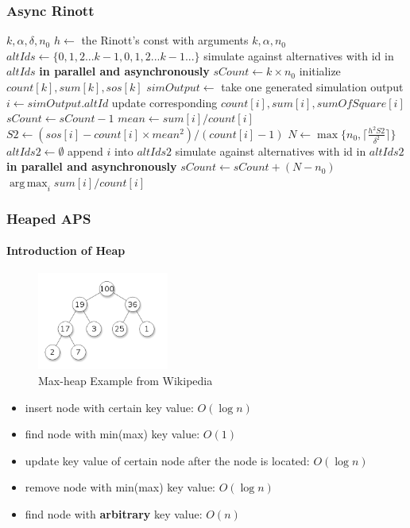 \documentclass{beamer}
\DeclareMathOperator*{\argmax}{arg\,max}
\begin{document}
\begin{frame}
\frametitle{Async Rinott}
\tiny
{
\begin{algorithmic}[1]
\Require $k, \alpha, \delta, n_0$
\State $h \gets$ the Rinott's const with arguments $k, \alpha, n_0$
\State $altIds \gets \{0, 1, 2...k - 1, 0, 1, 2...k - 1...\}$ 
\State simulate against alternatives with id in $altIds$ \textbf{in parallel and asynchronously}
\State $sCount \gets k \times n_0$ 
\State initialize $count[k], sum[k], sos[k]$ 
  \State $simOutput \gets $ take one generated simulation output \State $i \gets simOutput.altId$
  \State update corresponding $count[i], sum[i], sumOfSquare[i]$ \State $sCount \gets sCount - 1$
	\State $mean \gets sum[i] / count[i]$
	\State $S2 \gets (sos[i] - count[i] \times mean^2) / (count[i] - 1)$
	\State $N \gets \max\{n_0, \lceil \frac{h^2S2}{\delta^2} \rceil\}$
	  \State $altIds2 \gets \emptyset$
        \State append $i$ into $altIds2$
      \EndFor
	  \State simulate against alternatives with id in $altIds2$ \textbf{in parallel and asynchronously}
	  \State $sCount \gets sCount + (N - n_0)$
	\EndIf
  \EndIf
\EndWhile
\State \Return $\argmax_{i} sum[i] / count[i]$
\end{algorithmic}
}
\end{frame}

\begin{frame}
\frametitle{Heaped APS}
\framesubtitle{Introduction of Heap}
\begin{figure}[ht]
\centering
\includegraphics[height=32mm]{heap.png}
\caption{Max-heap Example from Wikipedia}
\end{figure}
\begin{itemize}
\item insert node with certain key value: $O(\log n)$
\item find node with min(max) key value: $O(1)$
\item update key value of certain node after the node is located: $O(\log n)$
\item remove node with min(max) key value: $O(\log n)$
\item find node with {\bf arbitrary} key value: $O(n)$
\end{itemize}
\end{frame}
\end{document}
